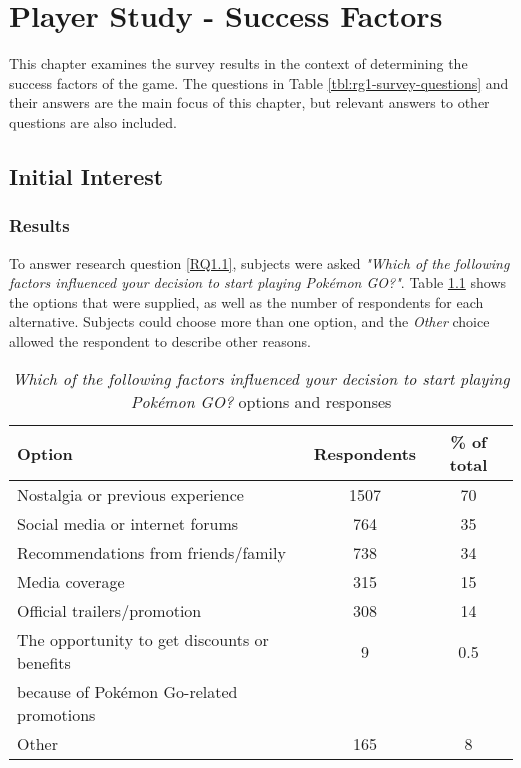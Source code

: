 
\chapter{Player Study - Success Factors}

This chapter examines the survey results in the context of determining the success factors of the game. The questions in Table \ref{tbl:rg1-survey-questions} and their answers are the main focus of this chapter, but relevant answers to other questions are also included.

\section{Initial Interest}
\label{sec:success-factors-initial-interest}


\subsection{Results}

To answer research question \ref{RQ1.1}, subjects were asked \emph{"Which of the following factors influenced your decision to start playing Pokémon GO?"}. Table \ref{tbl:initial-interest-options} shows the options that were supplied, as well as the number of respondents for each alternative. Subjects could choose more than one option, and the \emph{Other} choice allowed the respondent to describe other reasons.

\begin{table}[h]
	\caption{\emph{Which of the following factors influenced your decision to start playing Pokémon GO?} options and responses}
	\centering
	\label{tbl:initial-interest-options}
	\begin{tabular}{|l|c|c|}
		\hline
		\textbf{Option} & \textbf{Respondents} & \textbf{\% of total}\\
		\hline\hline
		Nostalgia or previous experience & 1507 & 70\\\hline
		Social media or internet forums & 764 & 35\\\hline
		Recommendations from friends/family & 738 & 34\\\hline
		Media coverage & 315 & 15\\\hline
		Official trailers/promotion & 308 & 14\\\hline
		The opportunity to get discounts or benefits & 9 & 0.5\\ because of Pokémon Go-related promotions && \\\hline
		Other & 165 & 8\\\hline
	\end{tabular}
\end{table}

